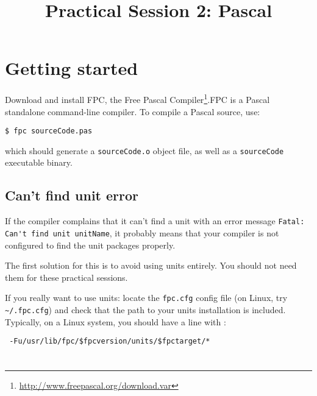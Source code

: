 \documentclass{../../tp}
\title{Practical Session 2: Pascal}
\author{}
\begin{document}
\maketitle


\section{Getting started}

Download and install \textsf{FPC}, the \textsf{Free Pascal Compiler}\footnote{ \url{http://www.freepascal.org/download.var}}.\textsf{FPC} is a \textsf{Pascal} standalone command-line compiler. To compile a \textsf{Pascal} source, use: 

\verb|$ fpc sourceCode.pas|

which should generate a \verb|sourceCode.o| object file, as well as a \verb|sourceCode| executable binary.

\subsection{Can't find unit error}

If the compiler complains that it can't find a unit with an error message \verb|Fatal: Can't find unit unitName|, it probably means that your compiler is not configured to find the unit packages properly.

The first solution for this is to avoid using units entirely. You should not need them for these practical sessions.

If you really want to use units: locate the \verb|fpc.cfg| config file (on Linux, try \verb|~/.fpc.cfg|) and check that the path to your units installation is included. Typically, on a Linux system, you should have a line with :

\verb| -Fu/usr/lib/fpc/$fpcversion/units/$fpctarget/*|


\section{}
\end{document}
